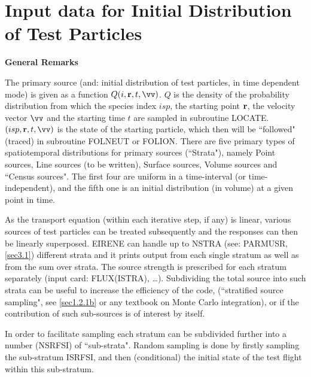 \section{Input data for Initial Distribution of Test Particles}
\label{sec2.7}

\textbf{General Remarks} 

\medskip 

The primary source (and: initial distribution of test particles, in time
dependent mode) is given as a function $Q(i, \vr,t , \vv)$.
$ Q $ is the density of the probability distribution from which the species
index $ isp $, the starting point $\mathbf{r} $, the velocity vector $\vv $ and the
starting time $ t $ are sampled in subroutine LOCATE.
$(isp, \vr,t, \vv)$ is the state of the starting particle, which then will be
``followed" (traced) in subroutine FOLNEUT or FOLION.
There are five primary types of spatiotemporal distributions for primary
sources (``Strata"), namely Point sources, Line sources (to be written),
Surface sources, Volume sources and ``Census sources".
The first four are uniform in a time-interval (or time-independent), and the
fifth one is an initial distribution (in volume) at a given point in time.

As the transport equation (within each iterative step, if any) is linear,
various sources of test particles can be treated subsequently and the responses
can then be linearly superposed.
EIRENE can handle up to NSTRA (see: PARMUSR, \cref{sec3.1}) different strata
and it prints output from each single stratum as well as from the sum over
strata.
The source strength is prescribed for each stratum separately (input card:
FLUX(ISTRA), \dots).
Subdividing the total source into such strata can be useful to increase the
efficiency of the code, (``stratified source sampling", see \cref{sec1.2.1b} or
any textbook on Monte Carlo integration), or if the contribution of such
sub-sources is of interest by itself.

In order to facilitate sampling each stratum can be subdivided further into a
number (NSRFSI) of ``sub-strata".
Random sampling is done by firstly sampling the sub-stratum ISRFSI, and then
(conditional) the initial state of the test flight within this sub-stratum.

